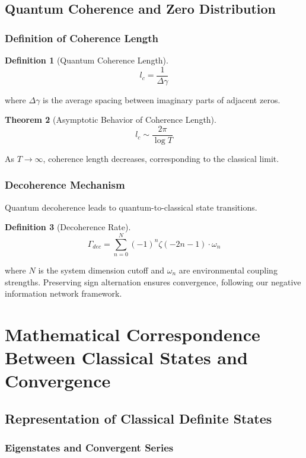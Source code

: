\documentclass[11pt]{article}
\theoremstyle{plain}
\newtheorem{theorem}{Theorem}[section]
\theoremstyle{definition}
\newtheorem{definition}[theorem]{Definition}
\theoremstyle{remark}
\begin{document}
\subsection{Quantum Coherence and Zero Distribution}

\subsubsection{Definition of Coherence Length}

\begin{definition}[Quantum Coherence Length]
$$l_c = \frac{1}{\Delta \gamma}$$
\end{definition}

where $\Delta \gamma$ is the average spacing between imaginary parts of adjacent zeros.

\begin{theorem}[Asymptotic Behavior of Coherence Length]
$$l_c \sim \frac{2\pi}{\log T}$$
\end{theorem}

As $T \to \infty$, coherence length decreases, corresponding to the classical limit.

\subsubsection{Decoherence Mechanism}

Quantum decoherence leads to quantum-to-classical state transitions.

\begin{definition}[Decoherence Rate]
$$\Gamma_{dec} = \sum_{n=0}^{N} (-1)^n \zeta(-2n-1) \cdot \omega_n$$
\end{definition}

where $N$ is the system dimension cutoff and $\omega_n$ are environmental coupling strengths. Preserving sign alternation ensures convergence, following our negative information network framework.

\section{Mathematical Correspondence Between Classical States and Convergence}

\subsection{Representation of Classical Definite States}

\subsubsection{Eigenstates and Convergent Series}
\end{document}
